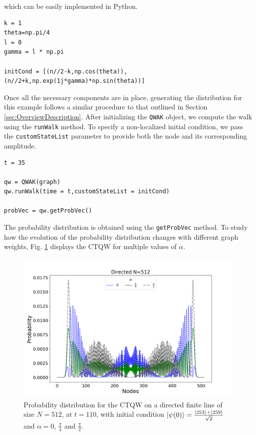 \documentclass[../../main.tex]{subfiles}
\begin{document}
which can be easily implemented in Python. 

\begin{lstlisting}[style=code,escapeinside={__}]
k = 1
theta=np.pi/4
l = 0
gamma = l * np.pi

initCond = [(n//2-k,np.cos(theta)),(n//2+k,np.exp(1j*gamma)*np.sin(theta))]
\end{lstlisting}

Once all the necessary components are in place, generating the distribution for
this example follows a similar procedure to that outlined in Section
\ref{sec:OverviewDescription}. After initializing the \texttt{QWAK} object, we
compute the  walk using the \texttt{runWalk} method. To specify a
non-localized initial condition, we pass the \texttt{customStateList} parameter
to provide both the node and its corresponding amplitude.

\begin{lstlisting}[style=code,escapeinside={__}]
t = 35

qw = QWAK(graph)
qw.runWalk(time = t,customStateList = initCond)

probVec = qw.getProbVec()
\end{lstlisting}

The probability distribution is obtained using the \texttt{getProbVec} method. To
study how the evolution of the probability distribution changes with different
graph weights, Fig. \ref{fig:multipleAlphaOrientedDynamics} displays the CTQW
for multiple values of $\alpha$.

\begin{figure}[!h]
    \centering
    \includegraphics[scale=\mysinglefigurescale]{img/QWAK/OrientedDynamics/orDynN512NW3Alpha0.79-1.57TMAX110.png}
    \caption{Probability distribution for the CTQW on a 
        directed finite line of size $N=512$, at $t=110$, with initial condition  $\ket{\psi(0)}=\frac{\ket{253}+\ket{259}}{\sqrt{2}}$
    and $\alpha = 0$, $\frac{\pi}{4}$ and $\frac{\pi}{2}$.}
    \label{fig:multipleAlphaOrientedDynamics}
\end{figure}
\end{document}
